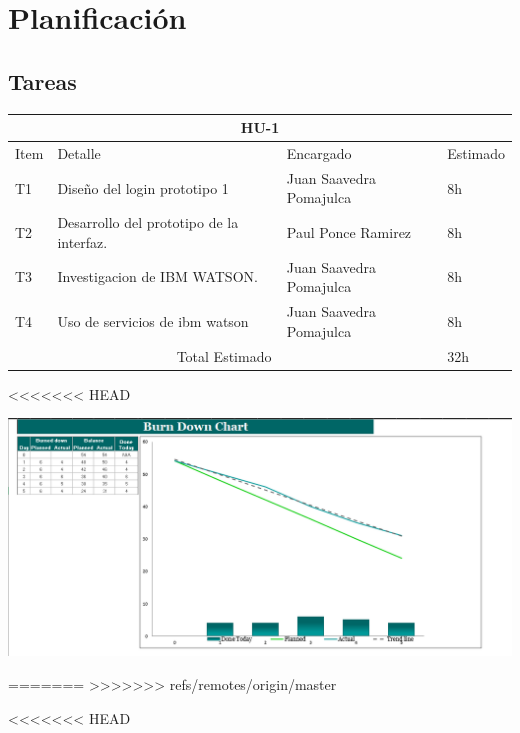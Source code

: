 \chapter{Planificación}
\section{Tareas}
\begin{table}[htbp]
	\begin{center}
		\begin{tabular}{| p{0.7cm} | p{10cm} | p{3.2cm} | p{1.8cm}|}
			\hline
			\multicolumn{4}{|c|}{HU-1}\\
			\hline
			Item & Detalle & Encargado & Estimado \\
			\hline
			T1 &Diseño del login prototipo 1 & Juan Saavedra Pomajulca & 8h \\
			\hline
			T2 & Desarrollo del prototipo de la interfaz. & Paul Ponce Ramirez & 8h \\
			\hline
			T3 & Investigacion de IBM WATSON. & Juan Saavedra Pomajulca & 8h \\
			\hline
			T4 & Uso de servicios de ibm watson & Juan Saavedra Pomajulca & 8h \\
			\hline
			\multicolumn{3}{|c|}{Total Estimado} & 32h\\
			\hline
		\end{tabular}
	\end{center}
\end{table}
<<<<<<< HEAD

\centering
	\includegraphics[width=1.20\textwidth]{img/burnt}\par\vspace{1cm}
	\vspace{0.30cm}	



=======
>>>>>>> refs/remotes/origin/master

<<<<<<< HEAD

